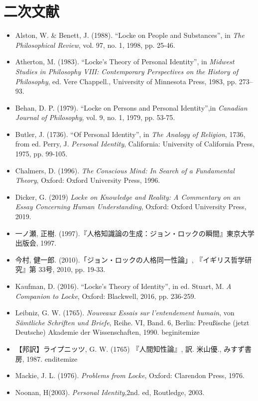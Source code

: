 \documentclass[a4j,oneside]{jsbook}
\begin{document}
\section*{二次文献}
\begin{itemize}
\item{} Alston, W. \& Benett, J. (1988). “Locke on People and Substances”, in {\itshape The Philosophical Review}, vol. 97, no. 1, 1998, pp. 25-46.
\item{} Atherton, M. (1983). “Locke’s Theory of Personal Identity”, in {\itshape Midwest Studies in Philosophy VIII: Contemporary Perspectives on the History of Philosophy}, ed. Vere Chappell., University of Minnesota Press, 1983, pp. 273–93. 
\item{} Behan, D. P. (1979). “Locke on Persons and Personal Identity”,in {\itshape Canadian Journal of Philosophy}, vol. 9, no. 1, 1979, pp. 53-75.
\item{} Butler, J. (1736).  “Of Personal Identity”, in {\itshape The Analogy of Religion}, 1736, from ed. Perry, J. {\itshape Personal Identity}, California: University of California Press, 1975, pp. 99-105.
\item{} Chalmers, D. (1996). {\itshape The Conscious Mind: In Search of a Fundamental Theory}, Oxford: Oxford University Press, 1996.
\item{} Dicker, G. (2019) {\itshape Locke on Knowledge and Reality: A Commentary on an Essay Concerning Human Understanding}, Oxford: Oxford University Press, 2019.
\item{} 一ノ瀬, 正樹. (1997).『人格知識論の生成：ジョン・ロックの瞬間』東京大学出版会, 1997.
\item{} 今村, 健一郎. (2010).「ジョン・ロックの人格同一性論」, 『イギリス哲学研究』第
33号, 2010, pp. 19-33.
\item{} Kaufman, D. (2016). “Locke’s Theory of Identity”, in ed. Stuart, M. {\itshape A Companion to Locke}, Oxford: Blackwell, 2016, pp. 236-259.
\item{} Leibniz, G. W. (1765). {\itshape Nouveaux Essais sur l'entendement humain}, von {\itshape Sämtliche Schriften und Briefe}, Reihe. VI, Band. 6, Berlin: Preußische (jetzt Deutsche) Akademie der Wissenschaften, 1990.
begin{itemize}
\item[] 【邦訳】ライプニッツ, G. W. (1765) 『人間知性論』, 訳. 米山優., みすず書房, 1987.
end{itemize}
\item{} Mackie, J. L. (1976). {\itshape Problems from Locke}, Oxford: Clarendon Press, 1976.
\item{} Noonan, H(2003).  {\itshape Personal Identity},2nd. ed, Routledge, 2003.

\end{itemize}
\end{document}
